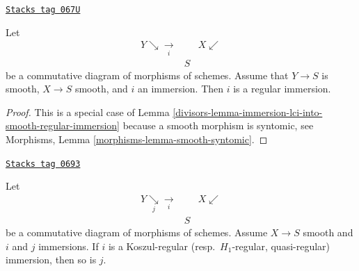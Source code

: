 \begin{lemma}
\label{divisors-lemma-immersion-smooth-into-smooth-regular-immersion}
\href{https://stacks.math.columbia.edu/tag/067U}{\texttt{Stacks tag 067U}}

Let
$$
\begin{array}{ccc}Y \searrow\underset{i}{\longrightarrow} &  & X \swarrow \\  & S & \end{array}
$$
be a commutative diagram of morphisms of schemes.
Assume that $Y \to S$ is smooth, $X \to S$ smooth, and
$i$ an immersion. Then $i$ is a regular immersion.
\end{lemma}

\begin{proof}

This is a special case of
Lemma \ref{divisors-lemma-immersion-lci-into-smooth-regular-immersion}
because a smooth morphism is syntomic, see
Morphisms, Lemma \ref{morphisms-lemma-smooth-syntomic}.
\end{proof}

\begin{lemma}
\label{divisors-lemma-push-regular-immersion-thru-smooth}
\href{https://stacks.math.columbia.edu/tag/0693}{\texttt{Stacks tag 0693}}

Let
$$
\begin{array}{ccc}Y \underset{j}{\searrow}\underset{i}{\longrightarrow} &  & X \swarrow \\  & S & \end{array}
$$
be a commutative diagram of morphisms of schemes.
Assume $X \to S$ smooth and $i$ and $j$ immersions.
If $i$ is a Koszul-regular (resp.\ $H_1$-regular, quasi-regular)
immersion, then so is $j$.
\end{lemma}

